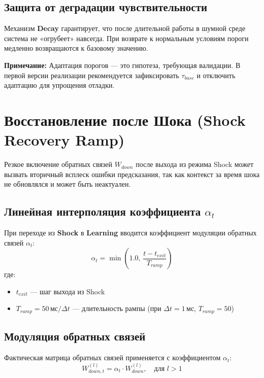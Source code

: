 \subsection{Защита от деградации чувствительности}

Механизм \textbf{Decay} гарантирует, что после длительной работы в шумной среде система не «огрубеет» навсегда. При возврате к нормальным условиям пороги медленно возвращаются к базовому значению.

\textbf{Примечание:} Адаптация порогов — это гипотеза, требующая валидации. В первой версии реализации рекомендуется зафиксировать $\tau_{base}$ и отключить адаптацию для упрощения отладки.

\section{Восстановление после Шока (Shock Recovery Ramp)}

Резкое включение обратных связей $W_{down}$ после выхода из режима Shock может вызвать вторичный всплеск ошибки предсказания, так как контекст за время шока не обновлялся и может быть неактуален.

\subsection{Линейная интерполяция коэффициента $\alpha_t$}

При переходе из \textbf{Shock} в \textbf{Learning} вводится коэффициент модуляции обратных связей $\alpha_t$:
\begin{equation}
\alpha_t = \min\left(1.0, \, \frac{t - t_{exit}}{T_{ramp}}\right)
\label{eq:alpha_ramp}
\end{equation}
где:
\begin{itemize}
    \item $t_{exit}$ — шаг выхода из Shock
    \item $T_{ramp} = 50 \, \text{мс} / \Delta t$ — длительность рампы (при $\Delta t = 1 \, \text{мс}$, $T_{ramp} = 50$)
\end{itemize}

\subsection{Модуляция обратных связей}

Фактическая матрица обратных связей применяется с коэффициентом $\alpha_t$:
\begin{equation}
W_{down, t}^{(l)} = \alpha_t \cdot W_{down}^{(l)}, \quad \text{для } l > 1
\label{eq:down_modulation}
\end{equation}

